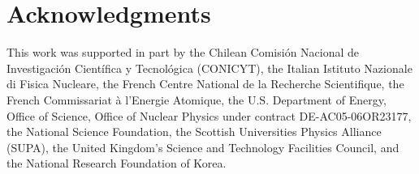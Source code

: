 \documentclass[3p,times,twocolumn]{elsarticle}
\begin{document}




















\section{Acknowledgments}

This work was supported in part by the Chilean Comisi\'on Nacional de Investigaci\'on Cient\'ifica y Tecnol\'ogica
(CONICYT), the Italian Istituto Nazionale di Fisica Nucleare, the French Centre National de la Recherche Scientifique,
the French Commissariat \`{a} l'Energie Atomique, the U.S. Department of Energy, Office of Science, Office of
Nuclear Physics under contract DE-AC05-06OR23177, the National Science Foundation, the Scottish Universities
Physics Alliance (SUPA), the United Kingdom's Science and Technology Facilities Council, and the National Research
Foundation of Korea.
\end{document}
